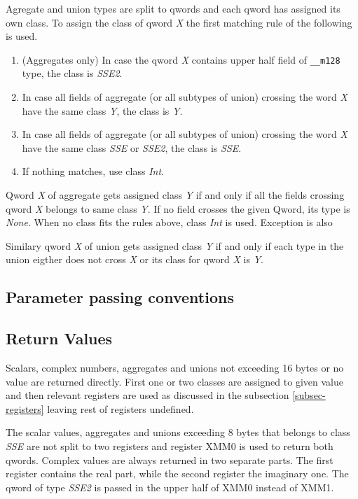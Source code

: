 Agregate and union types are split to qwords and each qword has
assigned its own class. To assign the class of qword \emph{X} the
first matching rule of the following is used.
\begin{enumerate}
\item (Aggregates only) In case the qword \emph{X} contains upper half field of
\verb|__m128| type, the class is \emph{SSE2}.

\item In case all fields of aggregate (or all subtypes of union) crossing the
word \emph{X} have the same class \emph{Y}, the class is \emph{Y}.

\item In case all fields of aggregate (or all subtypes of union) crossing the
word \emph{X} have the same class \emph{SSE} or \emph{SSE2}, the class
is \emph{SSE}.

\item If nothing matches, use class \emph{Int}.
\end{enumerate}

Qword \emph{X} of aggregate gets assigned class \emph{Y} if and only
if all the fields crossing qword \emph{X} belongs to same class \emph{Y}.  If
no field crosses the given Qword, its type is \emph{None}. When no class fits
the rules above, class \emph{Int} is used.  Exception is also 

Similary qword \emph{X} of union gets assigned class \emph{Y} if and only if
each type in the union eigther does not cross \emph{X} or its class for qword
\emph{X} is \emph{Y}.

\subsection{Parameter passing conventions}

\subsection{Return Values}

Scalars, complex numbers, aggregates and unions not exceeding 16 bytes or no
value are returned directly.  First one or two classes are assigned to given
value and then relevant registers are used as discussed in the subsection
\ref{subsec-registers} leaving rest of registers undefined.

The scalar values, aggregates and unions exceeding 8 bytes that
belongs to class \emph{SSE} are not split to two registers and
register XMM0 is used to return both qwords.  Complex values are
always returned in two separate parts.  The first register contains
the real part, while the second register the imaginary one. The qword
of type \emph{SSE2} is passed in the upper half of XMM0 instead of
XMM1.

